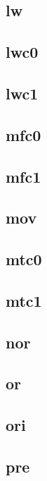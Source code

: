 \subsection*{lw}

\subsection*{lwc0}

\subsection*{lwc1}

\subsection*{mfc0}

\subsection*{mfc1}

\subsection*{mov}

\subsection*{mtc0}

\subsection*{mtc1}

\subsection*{nor}

\subsection*{or}

\subsection*{ori}

\subsection*{pre}

